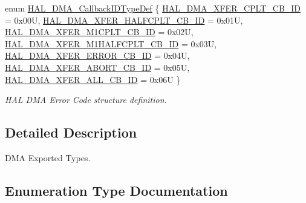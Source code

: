 \begin{DoxyCompactItemize}
enum \mbox{\hyperlink{group___d_m_a___exported___types_gafbe8b2bd9ce2128de6cdc08ccde7e8ad}{H\+A\+L\+\_\+\+D\+M\+A\+\_\+\+Callback\+I\+D\+Type\+Def}} \{ \newline
\mbox{\hyperlink{group___d_m_a___exported___types_ggafbe8b2bd9ce2128de6cdc08ccde7e8ada7d4463d9db2e6d15282128b44ae08e12}{H\+A\+L\+\_\+\+D\+M\+A\+\_\+\+X\+F\+E\+R\+\_\+\+C\+P\+L\+T\+\_\+\+C\+B\+\_\+\+ID}} = 0x00U, 
\mbox{\hyperlink{group___d_m_a___exported___types_ggafbe8b2bd9ce2128de6cdc08ccde7e8ada4b1606f39a4eec41d958bc878719f046}{H\+A\+L\+\_\+\+D\+M\+A\+\_\+\+X\+F\+E\+R\+\_\+\+H\+A\+L\+F\+C\+P\+L\+T\+\_\+\+C\+B\+\_\+\+ID}} = 0x01U, 
\mbox{\hyperlink{group___d_m_a___exported___types_ggafbe8b2bd9ce2128de6cdc08ccde7e8ada09feb1bab1c32b35afd27b9316958051}{H\+A\+L\+\_\+\+D\+M\+A\+\_\+\+X\+F\+E\+R\+\_\+\+M1\+C\+P\+L\+T\+\_\+\+C\+B\+\_\+\+ID}} = 0x02U, 
\mbox{\hyperlink{group___d_m_a___exported___types_ggafbe8b2bd9ce2128de6cdc08ccde7e8adac2e68a660d9830fa1e965482b9befbb9}{H\+A\+L\+\_\+\+D\+M\+A\+\_\+\+X\+F\+E\+R\+\_\+\+M1\+H\+A\+L\+F\+C\+P\+L\+T\+\_\+\+C\+B\+\_\+\+ID}} = 0x03U, 
\newline
\mbox{\hyperlink{group___d_m_a___exported___types_ggafbe8b2bd9ce2128de6cdc08ccde7e8ada3e76bc89154e0b50333cc551bf0337a6}{H\+A\+L\+\_\+\+D\+M\+A\+\_\+\+X\+F\+E\+R\+\_\+\+E\+R\+R\+O\+R\+\_\+\+C\+B\+\_\+\+ID}} = 0x04U, 
\mbox{\hyperlink{group___d_m_a___exported___types_ggafbe8b2bd9ce2128de6cdc08ccde7e8ada3059a9412e0624699e9123ba2bccdf3e}{H\+A\+L\+\_\+\+D\+M\+A\+\_\+\+X\+F\+E\+R\+\_\+\+A\+B\+O\+R\+T\+\_\+\+C\+B\+\_\+\+ID}} = 0x05U, 
\mbox{\hyperlink{group___d_m_a___exported___types_ggafbe8b2bd9ce2128de6cdc08ccde7e8adac9935fd906719942d6b09cfd55e837f0}{H\+A\+L\+\_\+\+D\+M\+A\+\_\+\+X\+F\+E\+R\+\_\+\+A\+L\+L\+\_\+\+C\+B\+\_\+\+ID}} = 0x06U
 \}
\begin{DoxyCompactList}\small\item\em H\+AL D\+MA Error Code structure definition. \end{DoxyCompactList}\end{DoxyCompactItemize}


\subsection{Detailed Description}
D\+MA Exported Types. 



\subsection{Enumeration Type Documentation}
\mbox{\label{group___d_m_a___exported___types_gafbe8b2bd9ce2128de6cdc08ccde7e8ad}} 
